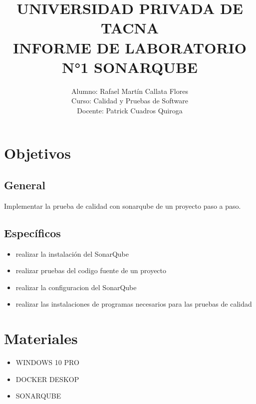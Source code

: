 \documentclass[preprint,12pt]{elsarticle}
\begin{document}
	
	\begin{frontmatter}
		\title{\huge UNIVERSIDAD PRIVADA DE TACNA \\}
		\title{INFORME DE LABORATORIO N°1 SONARQUBE }
		\author{
			Alumno: Rafael Martín Callata Flores \\
			Curso: Calidad y Pruebas de Software \\
			Docente: Patrick Cuadros Quiroga
		}
		\address{Tacna, Perú}
	\end{frontmatter}


\section{Objetivos}

	\subsection{\textbf{General}}
	Implementar la prueba de calidad con sonarqube de un proyecto paso a paso.
	\subsection{\textbf{Específicos}}
	\begin{itemize}
		\item realizar la instalación del SonarQube
		\item realizar pruebas del codigo fuente de un proyecto
		\item realizar la configuracion del SonarQube
		\item realizar las instalaciones de programas necesarios para las pruebas de calidad 
	\end{itemize}
\section{\textbf{Materiales}}
	\begin{itemize}
		\item WINDOWS 10 PRO
		\item DOCKER DESKOP
		\item SONARQUBE
	\end{itemize}
\end{document}
